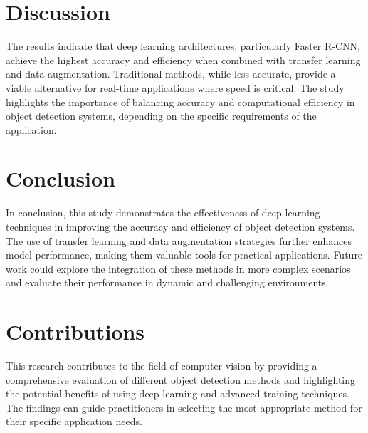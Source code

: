 \documentclass{article}
\begin{document}
\section{Discussion}
The results indicate that deep learning architectures, particularly Faster R-CNN, achieve the highest accuracy and efficiency when combined with transfer learning and data augmentation. Traditional methods, while less accurate, provide a viable alternative for real-time applications where speed is critical. The study highlights the importance of balancing accuracy and computational efficiency in object detection systems, depending on the specific requirements of the application.

\section{Conclusion}
In conclusion, this study demonstrates the effectiveness of deep learning techniques in improving the accuracy and efficiency of object detection systems. The use of transfer learning and data augmentation strategies further enhances model performance, making them valuable tools for practical applications. Future work could explore the integration of these methods in more complex scenarios and evaluate their performance in dynamic and challenging environments.

\section{Contributions}
This research contributes to the field of computer vision by providing a comprehensive evaluation of different object detection methods and highlighting the potential benefits of using deep learning and advanced training techniques. The findings can guide practitioners in selecting the most appropriate method for their specific application needs.
\end{document}
